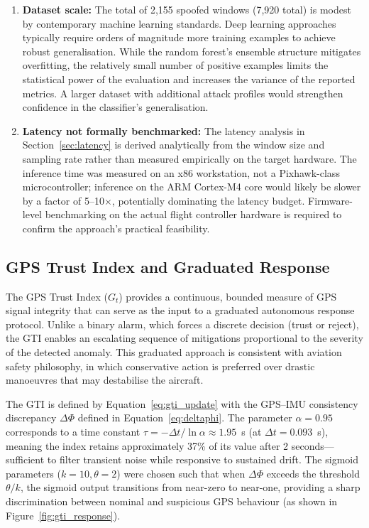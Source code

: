 \documentclass[electronics,article,accept,moreauthors]{Definitions/mdpi}
\begin{document}
\begin{enumerate}
    \item \textbf{Dataset scale:} The total of 2,155 spoofed windows (7,920 total) is modest by contemporary machine learning standards. Deep learning approaches typically require orders of magnitude more training examples to achieve robust generalisation. While the random forest's ensemble structure mitigates overfitting, the relatively small number of positive examples limits the statistical power of the evaluation and increases the variance of the reported metrics. A larger dataset with additional attack profiles would strengthen confidence in the classifier's generalisation.
    
    \item \textbf{Latency not formally benchmarked:} The latency analysis in Section~\ref{sec:latency} is derived analytically from the window size and sampling rate rather than measured empirically on the target hardware. The inference time was measured on an x86 workstation, not a Pixhawk-class microcontroller; inference on the ARM Cortex-M4 core would likely be slower by a factor of 5--10$\times$, potentially dominating the latency budget. Firmware-level benchmarking on the actual flight controller hardware is required to confirm the approach's practical feasibility.
\end{enumerate}

\subsection{GPS Trust Index and Graduated Response}
\label{sec:gti_graduated}

The GPS Trust Index ($G_t$) provides a continuous, bounded measure of GPS signal integrity that can serve as the input to a graduated autonomous response protocol. Unlike a binary alarm, which forces a discrete decision (trust or reject), the GTI enables an escalating sequence of mitigations proportional to the severity of the detected anomaly. This graduated approach is consistent with aviation safety philosophy, in which conservative action is preferred over drastic manoeuvres that may destabilise the aircraft.

The GTI is defined by Equation~\ref{eq:gti_update} with the GPS--IMU consistency discrepancy $\Delta\Phi$ defined in Equation~\ref{eq:deltaphi}. The parameter $\alpha = 0.95$ corresponds to a time constant $\tau = -\Delta t / \ln \alpha \approx 1.95$~s (at $\Delta t = 0.093$~s), meaning the index retains approximately 37\% of its value after 2 seconds---sufficient to filter transient noise while responsive to sustained drift. The sigmoid parameters ($k = 10, \theta = 2$) were chosen such that when $\Delta\Phi$ exceeds the threshold $\theta/k$, the sigmoid output transitions from near-zero to near-one, providing a sharp discrimination between nominal and suspicious GPS behaviour (as shown in Figure~\ref{fig:gti_response}). 
\end{document}
